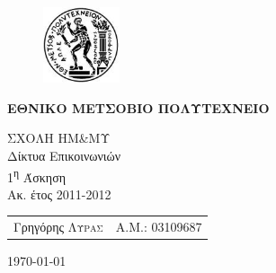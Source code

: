 \begin{titlepage}
\begin{center}
\begin{figure}[h] 
     \includegraphics[width=0.2\textwidth]{title/ntua_logo}
\end{figure}
\vspace{1cm}
\begin{LARGE}\textbf{ΕΘΝΙΚΟ ΜΕΤΣΟΒΙΟ ΠΟΛΥΤΕΧΝΕΙΟ\\[1.5cm]}\end{LARGE}
\begin{Large}
ΣΧΟΛΗ ΗΜ\&ΜΥ\\
Δίκτυα Επικοινωνιών\\[2cm]
1\textsuperscript{η} Άσκηση\\
Ακ. έτος 2011-2012\\
\end{Large}
\vfill
\begin{flushright}
\begin{tabular}{l r}
{Γρηγόρης \textsc{Λύρας}}&
{Α.Μ.: 03109687}\\
\end{tabular}
\end{flushright}

\large\today\\
\end{center}
\end{titlepage}


